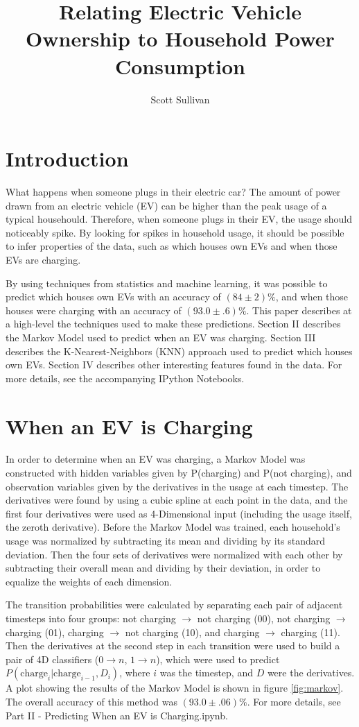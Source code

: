\documentclass[12pt]{extarticle}
\title{
	{\LARGE \bfseries Relating Electric Vehicle Ownership to Household Power Consumption}
}
\author{Scott Sullivan}
\begin{document}
\maketitle

\newpage

\section{Introduction}
What happens when someone plugs in their electric car?
The amount of power drawn from an electric vehicle (EV) can be higher than the peak usage of a typical househould.
Therefore, when someone plugs in their EV, the usage should noticeably spike.
By looking for spikes in household usage, it should be possible to infer properties of the data, such as which houses own EVs and when those EVs are charging.

By using techniques from statistics and machine learning, it was possible to predict which houses own EVs with an accuracy of $(84 \pm 2)\%$,
and when those houses were charging with an accuracy of $(93.0 \pm .6)\%$.
This paper describes at a high-level the techniques used to make these predictions.
Section II describes the Markov Model used to predict when an EV was charging.
Section III describes the K-Nearest-Neighbors (KNN) approach used to predict which houses own EVs.
Section IV describes other interesting features found in the data.
For more details, see the accompanying IPython Notebooks.

\section{When an EV is Charging}
In order to determine when an EV was charging, a Markov Model was constructed with hidden variables given by P(charging) and P(not charging), and observation variables given by the derivatives in the usage at each timestep.
The derivatives were found by using a cubic spline at each point in the data, and the first four derivatives were used as 4-Dimensional input (including the usage itself, the zeroth derivative).
Before the Markov Model was trained, each household's usage was normalized by subtracting its mean and dividing by its standard deviation.
Then the four sets of derivatives were normalized with each other by subtracting their overall mean and dividing by their deviation, in order to equalize the weights of each dimension.

The transition probabilities were calculated by separating each pair of adjacent timesteps into four groups: not charging $\rightarrow$ not charging (00), not charging $\rightarrow$ charging (01), charging $\rightarrow$ not charging (10), and charging $\rightarrow$ charging (11).
Then the derivatives at the second step in each transition were used to build a pair of 4D classifiers ($0 \rightarrow n$, $1 \rightarrow n$), which were used to predict $P(\mbox{charge}_i | \mbox{charge}_{i-1}, D_i)$, where $i$ was the timestep, and $D$ were the derivatives.
A plot showing the results of the Markov Model is shown in figure \ref{fig:markov}.
The overall accuracy of this method was $(93.0 \pm .06)\%$.
For more details, see Part II - Predicting When an EV is Charging.ipynb.
\end{document}
